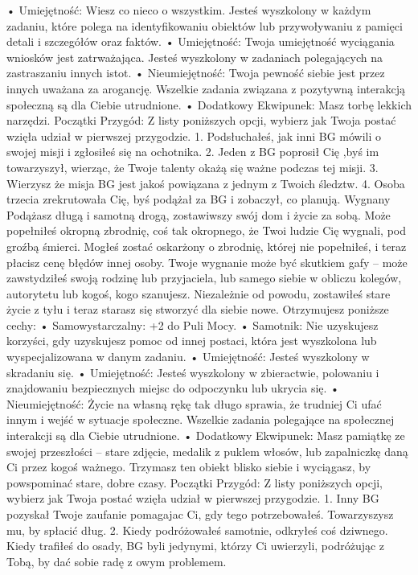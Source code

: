     • Umiejętność: Wiesz co nieco o wszystkim. Jesteś wyszkolony w każdym zadaniu, które polega na identyfikowaniu obiektów lub przywoływaniu z pamięci detali i szczegółów oraz faktów.
    • Umiejętność: Twoja umiejętność wyciągania wniosków jest zatrważająca. Jesteś wyszkolony w zadaniach polegających na zastraszaniu innych istot.
    • Nieumiejętność: Twoja pewność siebie jest przez innych uważana za arogancję. Wszelkie zadania związana z pozytywną interakcją społeczną są dla Ciebie utrudnione.
    • Dodatkowy Ekwipunek: Masz torbę lekkich narzędzi.
Początki Przygód: Z listy poniższych opcji, wybierz jak Twoja postać wzięła udział w pierwszej przygodzie.
1. Podsłuchałeś, jak inni BG mówili o swojej misji i zgłosiłeś się na ochotnika.
2. Jeden z BG poprosił Cię ,byś im towarzyszył, wierząc, że Twoje talenty okażą się ważne podczas tej misji. 
3. Wierzysz że misja BG jest jakoś powiązana z jednym z Twoich śledztw.
4. Osoba trzecia zrekrutowała Cię, byś podążał za BG i zobaczył, co planują.
Wygnany
Podążasz długą i samotną drogą, zostawiwszy swój dom i życie za sobą. Może popełniłeś okropną zbrodnię, coś tak okropnego, że Twoi ludzie Cię wygnali, pod groźbą śmierci. Mogłeś zostać oskarżony o zbrodnię, której nie popełniłeś, i teraz płacisz cenę błędów innej osoby. Twoje wygnanie może być skutkiem gafy – może zawstydziłeś swoją rodzinę lub przyjaciela, lub samego siebie w obliczu kolegów, autorytetu lub kogoś, kogo szanujesz. Niezależnie od powodu, zostawiłeś stare życie z tyłu i teraz starasz się stworzyć dla siebie nowe.
Otrzymujesz poniższe cechy:
    • Samowystarczalny: +2 do Puli Mocy.
    • Samotnik: Nie uzyskujesz korzyści, gdy uzyskujesz pomoc od innej postaci, która jest wyszkolona lub wyspecjalizowana w danym zadaniu.
    • Umiejętność: Jesteś wyszkolony w skradaniu się.
    • Umiejętność: Jesteś wyszkolony w zbieractwie, polowaniu i znajdowaniu bezpiecznych miejsc do odpoczynku lub ukrycia się.
    • Nieumiejętność: Życie na własną rękę tak długo sprawia, że trudniej Ci ufać innym i wejść w sytuacje społeczne. Wszelkie zadania polegające na społecznej interakcji są dla Ciebie utrudnione.
    • Dodatkowy Ekwipunek: Masz pamiątkę ze swojej przeszłości – stare zdjęcie, medalik z puklem włosów, lub zapalniczkę daną Ci przez kogoś ważnego. Trzymasz ten obiekt blisko siebie i wyciągasz, by powspominać stare, dobre czasy.
Początki Przygód: Z listy poniższych opcji, wybierz jak Twoja postać wzięła udział w pierwszej przygodzie.
1. Inny BG pozyskał Twoje zaufanie pomagajac Ci, gdy tego potrzebowałeś. Towarzyszysz mu, by spłacić dług.
2. Kiedy podróżowałeś samotnie, odkryłeś coś dziwnego. Kiedy trafiłeś do osady, BG byli jedynymi, którzy Ci uwierzyli, podróżując z Tobą, by dać sobie radę z owym problemem.
